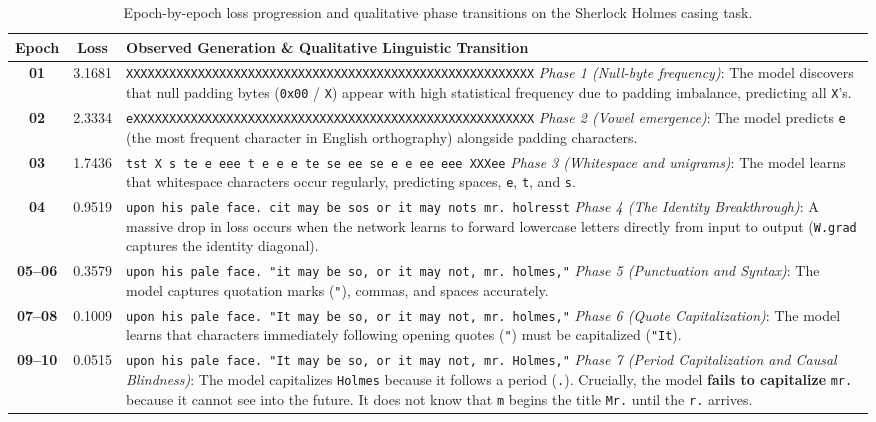 \documentclass[../../main.tex]{subfiles}
\begin{document}
\begin{table}[htbp]
\centering
\small
\caption{Epoch-by-epoch loss progression and qualitative phase transitions on the Sherlock Holmes casing task.}
\label{tab:sherlock_epochs}
\begin{tabularx}{\textwidth}{c c X}
\toprule
\textbf{Epoch} & \textbf{Loss} & \textbf{Observed Generation \& Qualitative Linguistic Transition} \\
\midrule
\textbf{01} & 3.1681 & \texttt{XXXXXXXXXXXXXXXXXXXXXXXXXXXXXXXXXXXXXXXXXXXXXXXXXXXXXXXXX} \newline \emph{Phase 1 (Null-byte frequency)}: The model discovers that null padding bytes (\texttt{0x00} / \texttt{X}) appear with high statistical frequency due to padding imbalance, predicting all \texttt{X}'s. \\
\midrule
\textbf{02} & 2.3334 & \texttt{eXXXXXXXXXXXXXXXXXXXXXXXXXXXXXXXXXXXXXXXXXXXXXXXXXXXXXXXX} \newline \emph{Phase 2 (Vowel emergence)}: The model predicts \texttt{e} (the most frequent character in English orthography) alongside padding characters. \\
\midrule
\textbf{03} & 1.7436 & \texttt{tst X s te e eee t e e e te se ee se e e ee eee XXXee} \newline \emph{Phase 3 (Whitespace and unigrams)}: The model learns that whitespace characters occur regularly, predicting spaces, \texttt{e}, \texttt{t}, and \texttt{s}. \\
\midrule
\textbf{04} & 0.9519 & \texttt{upon his pale face. cit may be sos or it may nots mr. holresst} \newline \emph{Phase 4 (The Identity Breakthrough)}: A massive drop in loss occurs when the network learns to forward lowercase letters directly from input to output (\texttt{W.grad} captures the identity diagonal). \\
\midrule
\textbf{05--06} & 0.3579 & \texttt{upon his pale face. "it may be so, or it may not, mr. holmes,"} \newline \emph{Phase 5 (Punctuation and Syntax)}: The model captures quotation marks (\texttt{"}), commas, and spaces accurately. \\
\midrule
\textbf{07--08} & 0.1009 & \texttt{upon his pale face. "It may be so, or it may not, mr. holmes,"} \newline \emph{Phase 6 (Quote Capitalization)}: The model learns that characters immediately following opening quotes (\texttt{"}) must be capitalized (\texttt{"It}). \\
\midrule
\textbf{09--10} & 0.0515 & \texttt{upon his pale face. "It may be so, or it may not, mr. Holmes,"} \newline \emph{Phase 7 (Period Capitalization and Causal Blindness)}: The model capitalizes \texttt{Holmes} because it follows a period (\texttt{.}). Crucially, the model \textbf{fails to capitalize} \texttt{mr.} because it cannot see into the future. It does not know that \texttt{m} begins the title \texttt{Mr.} until the \texttt{r.} arrives. \\
\bottomrule
\end{tabularx}
\end{table}
\end{document}
